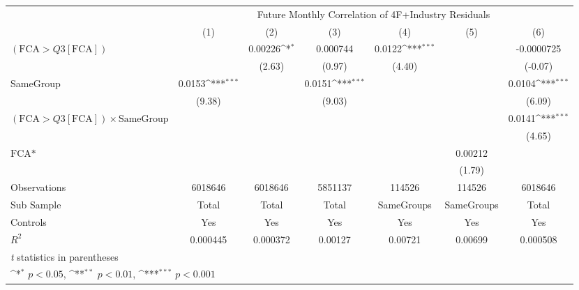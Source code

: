 {
\def\sym#1{\ifmmode^{#1}\else\(^{#1}\)\fi}
\begin{tabular}{l*{6}{c}}
\hline\hline
                &\multicolumn{6}{c}{Future Monthly Correlation of 4F+Industry Residuals}                                          \\\cmidrule(lr){2-7}
                &\multicolumn{1}{c}{(1)}         &\multicolumn{1}{c}{(2)}         &\multicolumn{1}{c}{(3)}         &\multicolumn{1}{c}{(4)}         &\multicolumn{1}{c}{(5)}         &\multicolumn{1}{c}{(6)}         \\
\hline
 $ (\text{FCA} > Q3[\text{FCA}]) $ &                  &  0.00226\sym{*}  & 0.000744         &   0.0122\sym{***}&                  &-0.0000725         \\
                &                  &   (2.63)         &   (0.97)         &   (4.40)         &                  &  (-0.07)         \\
[1em]
SameGroup       &   0.0153\sym{***}&                  &   0.0151\sym{***}&                  &                  &   0.0104\sym{***}\\
                &   (9.38)         &                  &   (9.03)         &                  &                  &   (6.09)         \\
[1em]
 $ (\text{FCA} > Q3[\text{FCA}]) \times  {\text{SameGroup} }  $ &                  &                  &                  &                  &                  &   0.0141\sym{***}\\
                &                  &                  &                  &                  &                  &   (4.65)         \\
[1em]
$ \text{FCA*} $ &                  &                  &                  &                  &  0.00212         &                  \\
                &                  &                  &                  &                  &   (1.79)         &                  \\
\hline
Observations    &  6018646         &  6018646         &  5851137         &   114526         &   114526         &  6018646         \\
Sub Sample      &    Total         &    Total         &    Total         &SameGroups         &SameGroups         &    Total         \\
Controls        &      Yes         &      Yes         &      Yes         &      Yes         &      Yes         &      Yes         \\
$ R^2 $         & 0.000445         & 0.000372         &  0.00127         &  0.00721         &  0.00699         & 0.000508         \\
\hline\hline
\multicolumn{7}{l}{\footnotesize \textit{t} statistics in parentheses}\\
\multicolumn{7}{l}{\footnotesize \sym{*} \(p<0.05\), \sym{**} \(p<0.01\), \sym{***} \(p<0.001\)}\\
\end{tabular}
}
